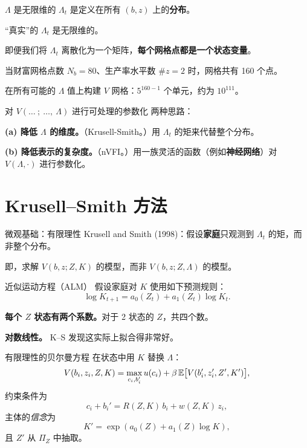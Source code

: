 \documentclass[10pt,aspectratio=169]{beamer}
\begin{document}
\begin{frame}{$\Lambda$ 是无限维的}
  $\Lambda_t$ 是定义在所有 $(b, z)$ 上的\textbf{分布}。

  ``真实''的 $\Lambda_t$ 是无限维的。

  即便我们将 $\Lambda_t$ 离散化为一个矩阵，\textbf{每个网格点都是一个状态变量}。

  当财富网格点数 $N_b = 80$、生产率水平数 $\#z = 2$ 时，网格共有 160 个点。

  在所有可能的 $\Lambda$ 值上构建 $V$ 网格：$5^{160-1}$ 个单元，约为 $10^{111}$。
\end{frame}

\begin{frame}{对 $V(\ldots\ ;\ \ldots,\ \Lambda)$ 进行可处理的参数化}
  两种思路：

  \textbf{(a) 降低 $\Lambda$ 的维度。}（Krusell-Smith。）用 $\Lambda_t$ 的矩来代替整个分布。

  \textbf{(b) 降低表示的复杂度。}（nVFI。）用一族灵活的函数（例如\textbf{神经网络}）对 $V(\Lambda, \cdot)$ 进行参数化。
\end{frame}

\section[K--S 方法]{Krusell--Smith 方法}

\begin{frame}{微观基础：有限理性}
  Krusell and Smith (1998)：假设\textbf{家庭}只观测到 $\Lambda_t$ 的矩，而非整个分布。

  即，求解 $V(b, z; Z, K)$ 的模型，而非 $V(b, z; Z, \Lambda)$ 的模型。
\end{frame}

\begin{frame}{近似运动方程（ALM）}
  假设家庭对 $K$ 使用如下预测规则：
  \[
    \log K_{t+1} = a_0(Z_t) + a_1(Z_t) \log K_t.
  \]

  \textbf{每个 $Z$ 状态有两个系数。}对于 2 状态的 $Z$，共四个数。

  \textbf{对数线性。} K--S 发现这实际上拟合得非常好。
\end{frame}

\begin{frame}{有限理性的贝尔曼方程}
  在状态中用 $K$ 替换 $\Lambda$：
  \[
    V(b_i, z_i, Z, K) = \max_{c_i, b_i'} u(c_i) + \beta\, \mathbb{E}\bigl[V(b_i', z_i', Z', K')\bigr],
  \]
  约束条件为
  \[
    c_i + b_i' = R(Z, K)\, b_i + w(Z, K)\, z_i,
  \]
  主体的\emph{信念}为
  \[
    K' = \exp(a_0(Z) + a_1(Z) \log K),
  \]
  且 $Z'$ 从 $\Pi_Z$ 中抽取。
\end{frame}
\end{document}
